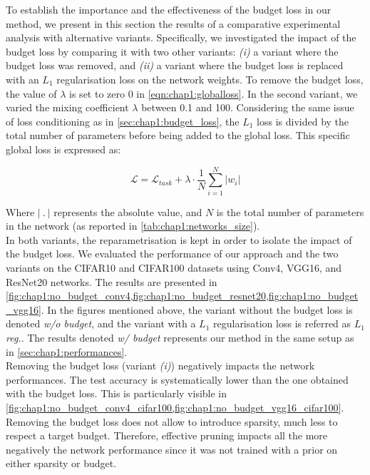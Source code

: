 
To establish the importance and the effectiveness of the budget loss in our method,
we present in this section the results of a comparative experimental analysis
with alternative variants.  Specifically, we investigated the impact of the
budget loss by comparing it with two other variants: \emph{(i)} a variant where the
budget loss was removed, and \emph{(ii)} a variant where the budget loss is replaced
with an $L_1$ regularisation loss on the network weights. To remove the budget
loss, the value of $\lambda$ is set to zero 0 in \cref{eqn:chap1:globalloss}. In the
second variant, we varied the mixing coefficient $\lambda$ between 0.1 and 100.
Considering the same issue of loss conditioning as in
\cref{sec:chap1:budget_loss}, the $L_1$ loss is divided by the total number of
parameters before being added to the global loss. This specific global loss is
expressed as:

\begin{equation}
  \label{eqn:chap1:globalloss_l1}
  \mathcal{L} = \mathcal{L}_{task} + \lambda \cdot \frac{1}{N} \sum_{i=1}^{N} \left| w_i \right|
\end{equation}

Where $|~.~|$ represents the absolute value, and $N$ is the total number of
parameters in the network (as reported in \cref{tab:chap1:networks_size}).\\

In both variants, the reparametrisation is kept in order to isolate the impact
of the budget loss. We evaluated the performance of our approach and the two
variants on the CIFAR10 and CIFAR100 datasets using Conv4, VGG16, and ResNet20
networks. The results are presented in
\cref{fig:chap1:no_budget_conv4,fig:chap1:no_budget_resnet20,fig:chap1:no_budget_vgg16}.
In the figures mentioned above, the variant without the budget loss is denoted
\emph{w/o budget}, and the variant with a $L_1$ regularisation loss is referred
as \emph{$L_1$ reg.}. The results denoted \emph{w/ budget} represents our method
in the same setup as in \cref{sec:chap1:performances}.\\

Removing the budget loss (variant \emph{(i)}) negatively impacts the network
performances. The test accuracy is systematically lower than the one obtained
with the budget loss. This is particularly visible in
\cref{fig:chap1:no_budget_conv4_cifar100,fig:chap1:no_budget_vgg16_cifar100}.
Removing the budget loss does not allow to introduce sparsity, much less to
respect a target budget. Therefore, effective pruning impacts all the more
negatively the network performance since it was not trained with a prior on
either sparsity or budget. \\

